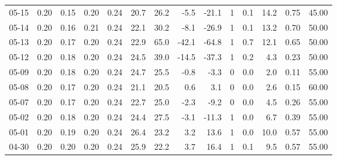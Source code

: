 \begin{threeparttable}
{\begin{tabular}{lrrrrrrrrrrrrr}
  05-15 &          0.20 &          0.15 &          0.20 &        0.24 &                20.7 &                26.2 &       -5.5 &        -21.1 &              1 &                 0.1 &             14.2 &            0.75 &                  45.00 \\
  05-14 &          0.20 &          0.16 &          0.21 &        0.24 &                22.1 &                30.2 &       -8.1 &        -26.9 &              1 &                 0.1 &             13.2 &            0.70 &                  50.00 \\
  05-13 &          0.20 &          0.17 &          0.20 &        0.24 &                22.9 &                65.0 &      -42.1 &        -64.8 &              1 &                 0.7 &             12.1 &            0.65 &                  50.00 \\
  05-12 &          0.20 &          0.18 &          0.20 &        0.24 &                24.5 &                39.0 &      -14.5 &        -37.3 &              1 &                 0.2 &              4.3 &            0.23 &                  50.00 \\
  05-09 &          0.20 &          0.18 &          0.20 &        0.24 &                24.7 &                25.5 &       -0.8 &         -3.3 &              0 &                 0.0 &              2.0 &            0.11 &                  55.00 \\
  05-08 &          0.20 &          0.17 &          0.20 &        0.24 &                21.1 &                20.5 &        0.6 &          3.1 &              0 &                 0.0 &              2.6 &            0.15 &                  60.00 \\
  05-07 &          0.20 &          0.17 &          0.20 &        0.24 &                22.7 &                25.0 &       -2.3 &         -9.2 &              0 &                 0.0 &              4.5 &            0.26 &                  55.00 \\
  05-02 &          0.20 &          0.18 &          0.20 &        0.24 &                24.4 &                27.5 &       -3.1 &        -11.3 &              1 &                 0.0 &              6.7 &            0.39 &                  55.00 \\
  05-01 &          0.20 &          0.19 &          0.20 &        0.24 &                26.4 &                23.2 &        3.2 &         13.6 &              1 &                 0.0 &             10.0 &            0.57 &                  55.00 \\
  04-30 &          0.20 &          0.20 &          0.20 &        0.24 &                25.9 &                22.2 &        3.7 &         16.4 &              1 &                 0.1 &              9.5 &            0.57 &                  55.00 \\

\end{tabular}}
\end{threeparttable}
